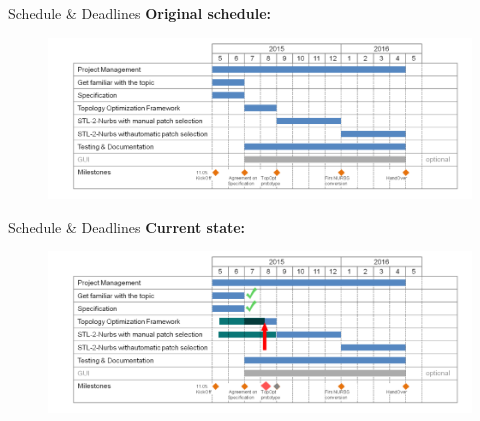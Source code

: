 \begin{frame}{Schedule \& Deadlines}
\textbf{Original schedule:}
\begin{figure}
\includegraphics[width=1.0\linewidth]{Pictures/Schedule/schedule.png}
\end{figure}
\end{frame}

\begin{frame}{Schedule \& Deadlines}
\textbf{Current state:}
\begin{figure}
\includegraphics[width=1.0\linewidth]{Pictures/Schedule/schedule_new.png}
\end{figure}
\end{frame}